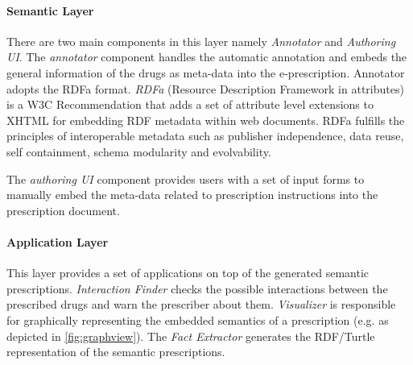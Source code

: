 \documentclass[10pt, conference, compsocconf]{IEEEtran}
\begin{document}
\paragraph{Semantic Layer}
There are two main components in this layer namely \emph{Annotator} and \emph{Authoring UI}.
The \emph{annotator} component handles the automatic annotation and embeds the general information of the drugs as meta-data into the e-prescription.
Annotator adopts the RDFa format. \emph{RDFa} (Resource Description Framework in attributes) is a W3C Recommendation that adds a set of attribute level extensions to XHTML for embedding RDF metadata within web documents.
RDFa fulfills the principles of interoperable metadata such as publisher independence, data reuse, self containment, schema modularity and evolvability.

The \emph{authoring UI} component provides users with a set of input forms to manually embed the meta-data related to prescription instructions into the prescription document.

\paragraph{Application Layer}
This layer provides a set of applications on top of the generated semantic prescriptions.
\emph{Interaction Finder} checks the possible interactions between the prescribed drugs and warn the prescriber about them.
\emph{Visualizer} is responsible for graphically representing the embedded semantics of a prescription (e.g. as depicted in \autoref{fig:graphview}).
The \emph{Fact Extractor} generates the RDF/Turtle representation of the semantic prescriptions.
\end{document}
